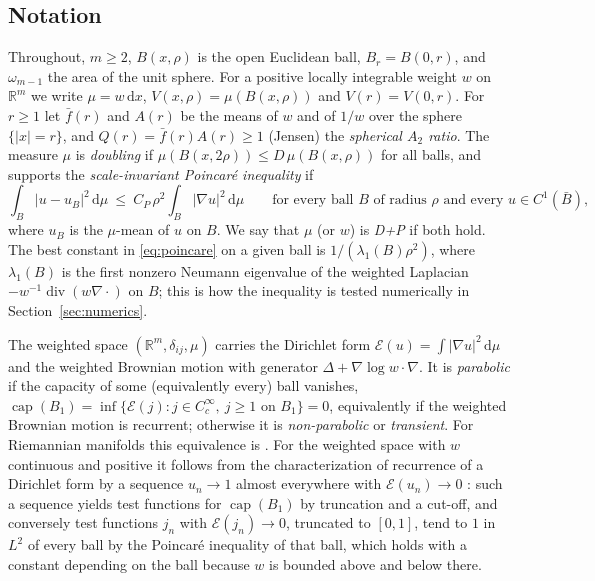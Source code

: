 \documentclass[11pt]{amsart}
\newcommand{\R}{\mathbb{R}}
\newcommand{\dd}{\,\mathrm{d}}
\newcommand{\abs}[1]{\lvert #1\rvert}
\newcommand{\fbar}{\bar f}
\DeclareMathOperator{\capa}{cap}
\DeclareMathOperator{\divg}{div}
\theoremstyle{plain}
\theoremstyle{definition}
\theoremstyle{remark}
\begin{document}
\subsection{Notation}\label{sec:notation}
Throughout, $m\ge2$, $B(x,\rho)$ is the open Euclidean ball, $B_r=B(0,r)$, and
$\omega_{m-1}$ the area of the unit sphere. For a positive locally integrable
weight $w$ on $\R^m$ we write $\mu=w\dd x$, $V(x,\rho)=\mu(B(x,\rho))$ and $V(r)=V(0,r)$. For $r\ge1$ let
$\fbar(r)$ and $A(r)$ be the means of $w$ and of $1/w$ over the sphere
$\{\abs x=r\}$, and $Q(r)=\fbar(r)A(r)\ge1$ (Jensen) the \emph{spherical $A_2$
ratio}. The measure $\mu$ is \emph{doubling} if $\mu(B(x,2\rho))\le
D\,\mu(B(x,\rho))$ for all balls, and supports the \emph{scale-invariant
Poincar\'e inequality} if
\begin{equation}\label{eq:poincare}
\int_B\abs{u-u_B}^2\dd\mu\ \le\ C_P\,\rho^2\int_B\abs{\nabla u}^2\dd\mu
\qquad\text{for every ball $B$ of radius $\rho$ and every $u\in C^1(\bar B)$},
\end{equation}
where $u_B$ is the $\mu$-mean of $u$ on $B$. We say that $\mu$ (or $w$) is
\emph{D+P} if both hold. The best constant in \eqref{eq:poincare} on a given
ball is $1/(\lambda_1(B)\rho^2)$, where $\lambda_1(B)$ is the first nonzero
Neumann eigenvalue of the weighted Laplacian $-w^{-1}\divg(w\nabla\cdot)$ on
$B$; this is how the inequality is tested numerically in
Section~\ref{sec:numerics}.

The weighted space $(\R^m,\delta_{ij},\mu)$ carries the Dirichlet form
$\mathcal E(u)=\int\abs{\nabla u}^2\dd\mu$ and the weighted Brownian motion with
generator $\Delta+\nabla\log w\cdot\nabla$. It is \emph{parabolic} if the
capacity of some (equivalently every) ball vanishes,
$\capa(B_1)=\inf\{\mathcal E(j):j\in C_c^\infty,\ j\ge1\text{ on }B_1\}=0$,
equivalently if the weighted Brownian motion is recurrent; otherwise it is
\emph{non-parabolic} or \emph{transient}. For Riemannian manifolds this
equivalence is \cite[Thm.~5.1]{grigoryan1999}. For the weighted space with $w$
continuous and positive it follows from the characterization of recurrence of
a Dirichlet form by a sequence $u_n\to1$ almost everywhere with
$\mathcal E(u_n)\to0$ \cite[Thm.~1.6.3]{fukushimaoshimatakeda2011}: such a
sequence yields test functions for $\capa(B_1)$ by truncation and a cut-off,
and conversely test functions $j_n$ with $\mathcal E(j_n)\to0$, truncated to
$[0,1]$, tend to $1$ in $L^2$ of every ball by the Poincar\'e inequality of
that ball, which holds with a constant depending on the ball because $w$ is
bounded above and below there.
\end{document}
